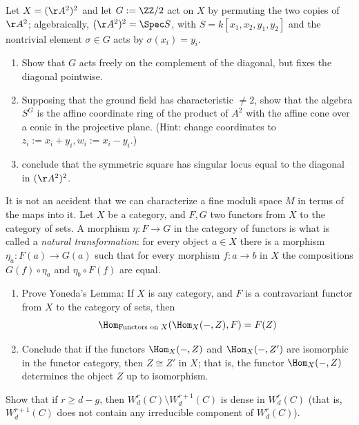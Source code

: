 \begin{exercise}
 \label{sym2A2} 
 Let $X = (\AA^{2})^{2}$ and let $G := \ZZ/2$ act on $X$ by permuting the two copies of  $\AA^{2}$; algebraically,
$(\AA^{2})^{2} = \Spec S$, with $S = k[x_{1},x_{2}, y_{1}, y_{2}]$ and the nontrivial element $\sigma\in G$ acts by
$\sigma(x_{i}) = y_{i}$. 
 \begin{enumerate}
\item Show that $G$ acts freely on the complement of the diagonal, but fixes the diagonal pointwise.
\item Supposing that the ground field has characteristic $\neq 2$,
show that the algebra $S^{G}$ is the affine coordinate ring of the product
of $A^2$ with the affine cone over a conic in the projective plane. 
(Hint: change coordinates to $z_i := x_i+y_i, w_i := x_i - y_i$.)
\item conclude that the symmetric square has singular locus equal to the diagonal in 
$(\AA^{2})^{2}$.
\end{enumerate}
\end{exercise}

\begin{exercise}\label{Yoneda}
It is not an accident that we can characterize a fine moduli space $M$ in terms of the maps into it. 
 Let $X$ be a category, and $F,G$ two functors from $X$ to the category of sets.
 A morphism $\eta: F\to G$ in the category of functors is what is called a \emph{natural transformation}:
 for every object $a\in X$ there is a morphism $\eta_a:F(a) \to G(a)$ such that for every
 morphism $f: a\to b$ in $X$ the compositions $G(f)\circ \eta_a$ and $\eta_b\circ F(f)$
 are equal. 
\begin{enumerate}
 \item Prove Yoneda's Lemma: If $X$ is any category, and $F$ is a contravariant functor from $X$ to the category of sets, then 
 $$
 \Hom_{\hbox{\scriptsize Functors on $X$}}(\Hom_X( -, Z), F) = F(Z)
 $$
 \item Conclude that if the functors $\Hom_X( -, Z)$ and $\Hom_X( -, Z')$ are isomorphic in the functor category, 
 then $Z \cong Z'$ in $X$; that is, the functor $\Hom_X( -, Z)$ determines the object $Z$ up to isomorphism.
 \end{enumerate}
\end{exercise}

\begin{exercise}
Show that if $r \geq d-g$, then $W^r_d(C) \setminus W^{r+1}_d(C)$ is dense in $W^r_d(C)$ (that is, $W^{r+1}_d(C)$ does not contain any irreducible component of $W^r_d(C)$).

\end{exercise}


